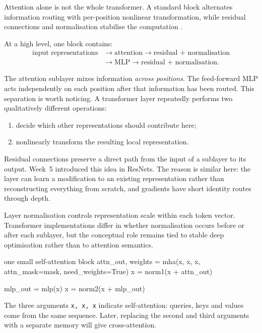 Attention alone is not the whole transformer. A standard block alternates information routing with per-position nonlinear transformation, while residual connections and normalisation stabilise the computation \parencite{vaswani2017}.

At a high level, one block contains:
\[
\begin{aligned}
  \text{input representations}
  &\rightarrow \text{attention}
   \rightarrow \text{residual + normalisation}\\
  &\rightarrow \text{MLP}
   \rightarrow \text{residual + normalisation}.
\end{aligned}
\]

The attention sublayer mixes information \emph{across positions}. The feed-forward MLP acts independently on each position after that information has been routed. This separation is worth noticing. A transformer layer repeatedly performs two qualitatively different operations:
\begin{enumerate}[leftmargin=*]
  \item decide which other representations should contribute here;
  \item nonlinearly transform the resulting local representation.
\end{enumerate}

Residual connections preserve a direct path from the input of a sublayer to its output. Week~5 introduced this idea in ResNets. The reason is similar here: the layer can learn a modification to an existing representation rather than reconstructing everything from scratch, and gradients have short identity routes through depth.

Layer normalisation controls representation scale within each token vector. Transformer implementations differ in whether normalisation occurs before or after each sublayer, but the conceptual role remains tied to stable deep optimisation rather than to attention semantics.

\begin{pytorchbox}{one small self-attention block}
attn_out, weights = mha(x, x, x,
                        attn_mask=mask,
                        need_weights=True)
x = norm1(x + attn_out)

mlp_out = mlp(x)
x = norm2(x + mlp_out)
\end{pytorchbox}

The three arguments \texttt{x, x, x} indicate self-attention: queries, keys and values come from the same sequence. Later, replacing the second and third arguments with a separate memory will give cross-attention.


